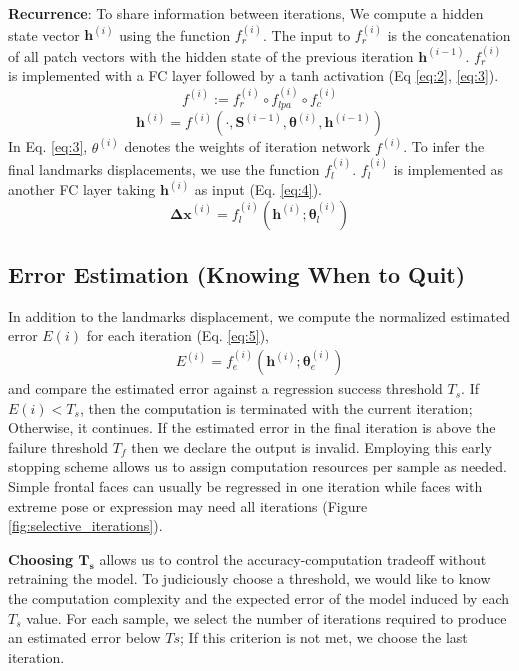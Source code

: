 \documentclass[9pt,twocolumn]{extarticle}
\begin{document}
\textbf{Recurrence}: To share information between iterations, We compute a hidden state vector $\textbf{h}^{(i)}$ using the function $f_r^{(i)}$. The input to $f_r^{(i)}$ is the concatenation of all patch vectors with the hidden state of the previous iteration $\textbf{h}^{(i-1)}$. $f_r^{(i)}$ is implemented with a FC layer followed by a tanh activation (Eq \ref{eq:2}, \ref{eq:3}).
\begin{equation}
\label{eq:2}
f^{(i)} :=  f_r^{(i)} \circ f_{lpa}^{(i)} \circ f_c^{(i)}
\end{equation}
\begin{equation}
\label{eq:3}
\mathbf{h}^{(i)} = f^{(i)}(\cdot, \mathbf{S}^{(i-1)}, \mathbf{\theta}^{(i)}, \mathbf{h}^{(i-1)})
\end{equation}
In Eq. \ref{eq:3}, $\theta^{(i)}$ denotes the weights of iteration network $f^{(i)}$.
To infer the final landmarks displacements, we use the function $f_l^{(i)}$. $f_l^{(i)}$ is implemented as another FC layer taking $\mathbf{h}^{(i)}$ as input (Eq. \ref{eq:4}). 
\begin{equation}
\label{eq:4}
\mathbf{\Delta x}^{(i)} = f_l^{(i)}(\mathbf{h}^{(i)}; \mathbf{\theta}_l^{(i)})
\end{equation}


\subsection{Error Estimation (Knowing When to Quit)}
In addition to the landmarks displacement, we compute the normalized estimated error $E(i)$ for each iteration (Eq. \ref{eq:5}), 
\begin{gather}
\label{eq:5}
E^{(i)} = f_e^{(i)}(\mathbf{h}^{(i)};  \mathbf{\theta}_e^{(i)})
\end{gather}
and compare the estimated error against a regression success threshold $T_s$. If $E(i) < T_s$, then the computation is terminated with the current iteration; Otherwise, it continues.  If the estimated error in the final iteration is above the failure threshold $T_f$ then we declare the output is invalid. Employing this early stopping scheme allows us to assign computation resources per sample as needed. Simple frontal faces can usually be regressed in one iteration while faces with extreme pose or expression may need all iterations (Figure \ref{fig:selective_iterations}).

\textbf{Choosing $\mathbf{T_s}$} allows us to control the accuracy-computation tradeoff without retraining the model. To judiciously choose a threshold, we would like to know the computation complexity and the expected error of the model induced by each $T_s$ value. For each sample, we select the number of iterations required to produce an estimated error below $Ts$; If this criterion is not met, we choose the last iteration.
\end{document}
